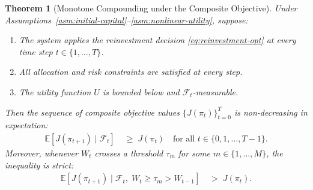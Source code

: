 \documentclass[12pt,openany]{book}
\newcommand{\calF}{\mathcal{F}}
\newcommand{\E}{\mathbb{E}}
\numberwithin{equation}{chapter}
\theoremstyle{plain}
\newtheorem{theorem}{Theorem}[chapter]
\theoremstyle{definition}
\theoremstyle{remark}
\numberwithin{equation}{chapter}
\theoremstyle{plain}
\begin{document}
\begin{theorem}[Monotone Compounding under the Composite Objective]
\label{thm:monotone-compounding}
Under Assumptions~\ref{asm:initial-capital}--\ref{asm:nonlinear-utility},
suppose:
\begin{enumerate}
  \item[\textup{(a)}] The system applies the reinvestment decision
        \eqref{eq:reinvestment-opt} at every time step $t \in
        \{1,\ldots,T\}$.
  \item[\textup{(b)}] All allocation and risk constraints are
        satisfied at every step.
  \item[\textup{(c)}] The utility function $U$ is bounded below
        and $\calF_t$-measurable.
\end{enumerate}
Then the sequence of composite objective values
$\{J(\pi_t)\}_{t=0}^T$ is non-decreasing in expectation:
\begin{align}
  \E\!\left[J(\pi_{t+1}) \mid \calF_t\right]
  &\;\geq\; J(\pi_t)
  \quad \text{for all } t \in \{0,1,\ldots,T-1\}.
  \label{eq:monotone-compounding}
\end{align}
Moreover, whenever $W_t$ crosses a threshold $\tau_m$ for some
$m \in \{1,\ldots,M\}$, the inequality is strict:
\begin{align}
  \E\!\left[J(\pi_{t+1}) \mid \calF_t,\;
  W_t \geq \tau_m > W_{t-1}\right]
  &\;>\; J(\pi_t).
  \label{eq:strict-compounding}
\end{align}
\end{theorem}
\end{document}

